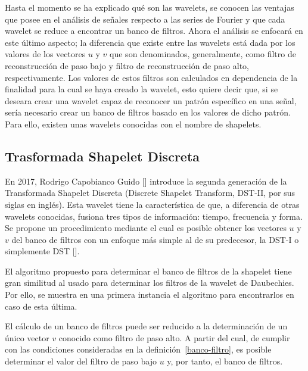 \par Hasta el momento se ha explicado qu\'e son las wavelets, se conocen las ventajas que posee en el an\'alisis de se\~nales respecto a las series de Fourier y que cada wavelet se reduce a encontrar un banco de filtros. Ahora el an\'alisis se enfocar\'a en este \'ultimo aspecto; la diferencia que existe entre las wavelets est\'a dada por los valores de los vectores $u$ y $v$ que son denominados, generalmente, como filtro de reconstrucci\'on de paso bajo y filtro de reconstrucci\'on de paso alto, respectivamente. Los valores de estos filtros son calculados en dependencia de la finalidad para la cual se haya creado la wavelet, esto quiere decir que, si se deseara crear una wavelet capaz de reconocer un patr\'on espec\'ifico en una se\~nal, ser\'ia necesario crear un banco de filtros basado en los valores de dicho patr\'on. Para ello, existen unas wavelets conocidas con el nombre de shapelets.\\

\subsection{Trasformada Shapelet Discreta}

\par En 2017, Rodrigo Capobianco Guido [\cite{10}] introduce la segunda generaci\'on de la Transformada Shapelet Discreta (Discrete Shapelet Transform, DST-II, por sus siglas en ingl\'es). Esta wavelet tiene la caracter\'istica de que, a diferencia de otras wavelets conocidas, fusiona tres tipos de informaci\'on: tiempo, frecuencia y forma. Se propone un procedimiento mediante el cual es posible obtener los vectores $u$ y $v$ del banco de filtros con un enfoque m\'as simple al de su predecesor, la DST-I o simplemente DST [\cite{11}].

\par El algoritmo propuesto para determinar el banco de filtros de la shapelet tiene gran similitud al usado para determinar los filtros de la wavelet de Daubechies. Por ello, se muestra en una primera instancia el algoritmo para encontrarlos en caso de esta \'ultima.

\par El c\'alculo de un banco de filtros puede ser reducido a la determinaci\'on de un \'unico vector $v$ conocido como filtro de paso alto. A partir del cual, de cumplir con las condiciones consideradas en la definici\'on~\ref{banco-filtro}, es posible determinar el valor del filtro de paso bajo $u$ y, por tanto, el banco de filtros.

